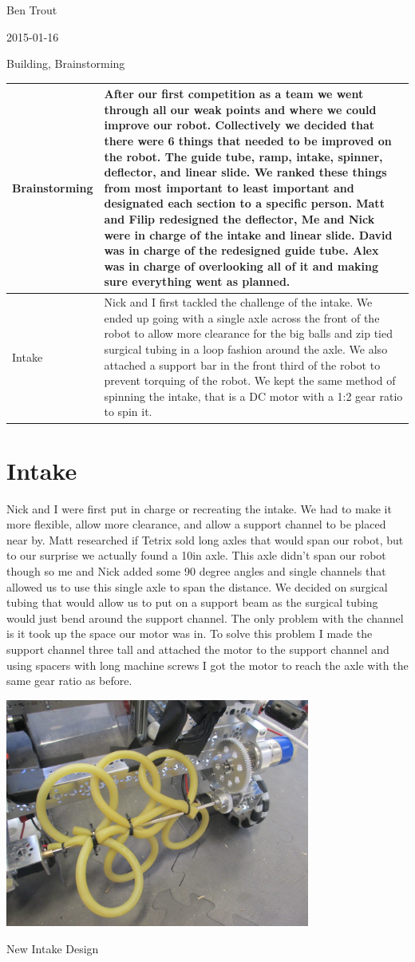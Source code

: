 Ben Trout

2015-01-16

Building, Brainstorming

\begin{tabular}{|p{5cm}|p{5cm}|}
\hline
Brainstorming&
After our first competition as a team we went through all our weak points and where we could improve our robot. Collectively we decided that there were 6 things that needed to be improved on the robot. The guide tube, ramp, intake, spinner, deflector, and linear slide. We ranked these things from most important to least important and designated each section to a specific person. Matt and Filip redesigned the deflector, Me and Nick were in charge of the intake and linear slide. David was in charge of the redesigned guide tube. Alex was in charge of overlooking all of it and making sure everything went as planned.
\\
\hline
Intake&
Nick and I first tackled the challenge of the intake. We ended up going with a single axle across the front of the robot to allow more clearance for the big balls and zip tied surgical tubing in a loop fashion around the axle. We also attached a support bar in the front third of the robot to prevent torquing of the robot. We kept the same method of spinning the intake, that is a DC motor with a 1:2 gear ratio to spin it.
\\
\hline
\end{tabular}

\section*{Intake}
Nick and I were first put in charge or recreating the intake. We had to make it more flexible, allow more clearance, and allow a support channel to be placed near by. Matt researched if Tetrix sold long axles that would span our robot, but to our surprise we actually found a 10in axle. This axle didn’t span our robot though so me and Nick added some 90 degree angles and single channels that allowed us to use this single axle to span the distance. We decided on surgical tubing that would allow us to put on a support beam as the surgical tubing would just bend around the support channel. The only problem with the channel is it took up the space our motor was in. To solve this problem I made the support channel three tall and attached the motor to the support channel and using spacers with long machine screws I got the motor to reach the axle with the same gear ratio as before.

\begin{center}
\includegraphics[width=10cm]{./Entries/Images/SurgicalIntake.JPG}
\end{center}

New Intake Design
